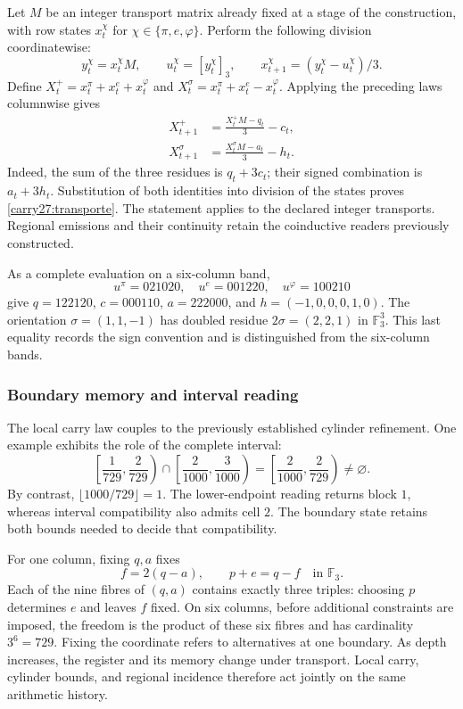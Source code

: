 Let \(M\) be an integer transport matrix already fixed
at a stage of the construction, with row states
\(x_t^\chi\) for \(\chi\in\{\pi,e,\varphi\}\).
Perform the following division coordinatewise:
\[
y_t^\chi=x_t^\chi M,\qquad
u_t^\chi=[y_t^\chi]_3,\qquad
x_{t+1}^\chi=(y_t^\chi-u_t^\chi)/3.
\]
Define \(X_t^+=x_t^\pi+x_t^e+x_t^\varphi\) and
\(X_t^\sigma=x_t^\pi+x_t^e-x_t^\varphi\).
Applying the preceding laws columnwise gives
\begin{equation}
\begin{aligned}
X_{t+1}^+&=\frac{X_t^+M-q_t}{3}-c_t,\\
X_{t+1}^\sigma&=\frac{X_t^\sigma M-a_t}{3}-h_t.
\end{aligned}
\label{carry27:transporte}
\end{equation}
Indeed, the sum of the three residues is \(q_t+3c_t\);
their signed combination is \(a_t+3h_t\). Substitution
of both identities into division of the states proves
\eqref{carry27:transporte}. The statement applies to
the declared integer transports. Regional emissions
and their continuity retain the coinductive readers
previously constructed.

As a complete evaluation on a six-column band,
\[
u^\pi=021020,\quad u^e=001220,\quad u^\varphi=100210
\]
give \(q=122120\), \(c=000110\), \(a=222000\), and
\(h=(-1,0,0,0,1,0)\). The orientation
\(\sigma=(1,1,-1)\) has doubled residue
\(2\sigma=(2,2,1)\) in \(\mathbb F_3^3\).
This last equality records the sign convention and
is distinguished from the six-column bands.

\subsubsection{Boundary memory and interval reading}

The local carry law couples to the previously established
cylinder refinement. One example exhibits the role of
the complete interval:
\[
\left[\frac1{729},\frac2{729}\right)
\cap
\left[\frac2{1000},\frac3{1000}\right)
=
\left[\frac2{1000},\frac2{729}\right)\ne\varnothing.
\]
By contrast, \(\lfloor1000/729\rfloor=1\).
The lower-endpoint reading returns block \(1\),
whereas interval compatibility also admits cell \(2\).
The boundary state retains both bounds needed to
decide that compatibility.

For one column, fixing \(q,a\) fixes
\[
f=2(q-a),\qquad p+e=q-f\quad\text{in }\mathbb F_3.
\]
Each of the nine fibres of \((q,a)\) contains exactly
three triples: choosing \(p\) determines \(e\) and
leaves \(f\) fixed. On six columns, before additional
constraints are imposed, the freedom is the product
of these six fibres and has cardinality \(3^6=729\).
Fixing the coordinate refers to alternatives at one
boundary. As depth increases, the register and its
memory change under transport. Local carry, cylinder
bounds, and regional incidence therefore act jointly
on the same arithmetic history.
